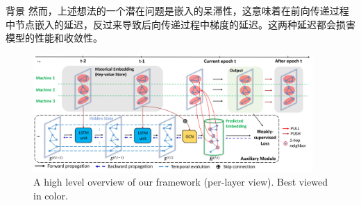 \begin{section}{背景}
然而，上述想法的一个潜在问题是嵌入的呆滞性，这意味着在前向传递过程中节点嵌入的延迟，反过来导致后向传递过程中梯度的延迟。这两种延迟都会损害模型的性能和收敛性。

\begin{figure}[t!]
    \begin{center}
      \includegraphics[width=0.95\textwidth]{figures/architecture.png}
    \end{center}
    \vspace{-4mm}
    \caption{A high level overview of our framework (per-layer view). Best viewed in color.}
    \label{fig:framework demo}
    \vspace{-3mm}
  \end{figure}
\end{section}

